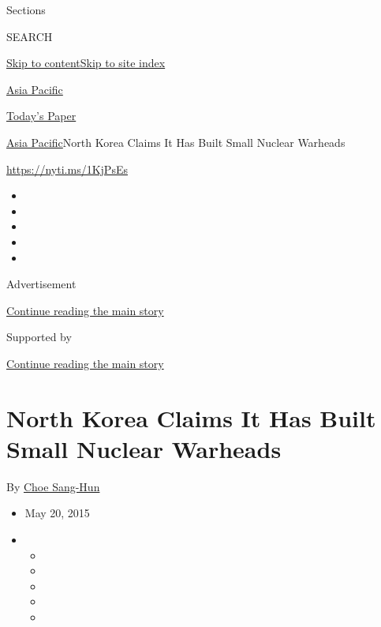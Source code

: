 Sections

SEARCH

\protect\hyperlink{site-content}{Skip to
content}\protect\hyperlink{site-index}{Skip to site index}

\href{https://www.nytimes.com/section/world/asia}{Asia Pacific}

\href{https://myaccount.nytimes.com/auth/login?response_type=cookie\&client_id=vi}{}

\href{https://www.nytimes.com/section/todayspaper}{Today's Paper}

\href{/section/world/asia}{Asia Pacific}\textbar{}North Korea Claims It
Has Built Small Nuclear Warheads

\url{https://nyti.ms/1KjPsEs}

\begin{itemize}
\item
\item
\item
\item
\item
\end{itemize}

Advertisement

\protect\hyperlink{after-top}{Continue reading the main story}

Supported by

\protect\hyperlink{after-sponsor}{Continue reading the main story}

\hypertarget{north-korea-claims-it-has-built-small-nuclear-warheads}{%
\section{North Korea Claims It Has Built Small Nuclear
Warheads}\label{north-korea-claims-it-has-built-small-nuclear-warheads}}

By \href{http://www.nytimes.com/by/choe-sang-hun}{Choe Sang-Hun}

\begin{itemize}
\item
  May 20, 2015
\item
  \begin{itemize}
  \item
  \item
  \item
  \item
  \item
  \end{itemize}
\end{itemize}

